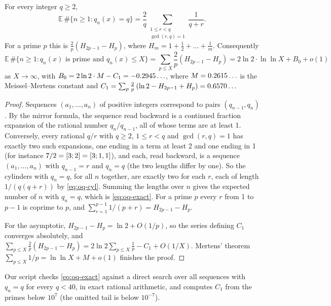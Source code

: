 \begin{theorem}\label{thm:oq-exact}
For every integer $q \ge 2$,
\begin{equation}\label{eq:oq-exact}
  \mathbb{E}\,\#\{n \ge 1 : q_n(x) = q\} = \frac{2}{q}\sum_{\substack{1 \le r < q\\ \gcd(r,q) = 1}} \frac{1}{q + r}.
\end{equation}
For a prime $p$ this is $\frac{2}{p}(H_{2p-1} - H_p)$, where $H_m = 1 + \frac12 + \dots + \frac1m$. Consequently
\begin{equation}\label{eq:oq-exactX}
  \mathbb{E}\,\#\{n \ge 1: q_n(x) \text{ is prime and } q_n(x) \le X\} = \sum_{p \le X}\frac{2}{p}\left(H_{2p-1} - H_p\right) = 2\ln 2 \cdot \ln\ln X + B_0 + o(1)
\end{equation}
as $X \to \infty$, with $B_0 = 2\ln 2 \cdot M - C_1 = -0.2945\ldots$, where $M = 0.2615\ldots$ is the Meissel--Mertens constant and $C_1 = \sum_p \frac{2}{p}\left(\ln 2 - H_{2p-1} + H_p\right) = 0.6570\ldots$
\end{theorem}

\begin{proof}
Sequences $(a_1, \dots, a_n)$ of positive integers correspond to pairs $(q_{n-1}, q_n)$. By the mirror formula, the sequence read backward is a continued fraction expansion of the rational number $q_n/q_{n-1}$, all of whose terms are at least 1. Conversely, every rational $q/r$ with $q \ge 2$, $1 \le r < q$ and $\gcd(r,q) = 1$ has exactly two such expansions, one ending in a term at least 2 and one ending in 1 (for instance $7/2 = [3; 2] = [3; 1, 1]$), and each, read backward, is a sequence $(a_1, \dots, a_n)$ with $q_{n-1} = r$ and $q_n = q$ (the two lengths differ by one). So the cylinders with $q_n = q$, for all $n$ together, are exactly two for each $r$, each of length $1/(q(q+r))$ by \eqref{eq:oq-cyl}. Summing the lengths over $n$ gives the expected number of $n$ with $q_n = q$, which is \eqref{eq:oq-exact}. For a prime $p$ every $r$ from 1 to $p-1$ is coprime to $p$, and $\sum_{r=1}^{p-1} 1/(p + r) = H_{2p-1} - H_p$.

For the asymptotic, $H_{2p-1} - H_p = \ln 2 + O(1/p)$, so the series defining $C_1$ converges absolutely, and $\sum_{p \le X} \frac2p(H_{2p-1} - H_p) = 2\ln 2\sum_{p \le X}\frac1p - C_1 + O(1/X)$. Mertens' theorem $\sum_{p \le X} 1/p = \ln\ln X + M + o(1)$ \citep[Thm.~427]{HardyWright2008} finishes the proof.
\end{proof}

Our script checks \eqref{eq:oq-exact} against a direct search over all sequences with $q_n = q$ for every $q < 40$, in exact rational arithmetic, and computes $C_1$ from the primes below $10^7$ (the omitted tail is below $10^{-7}$).

